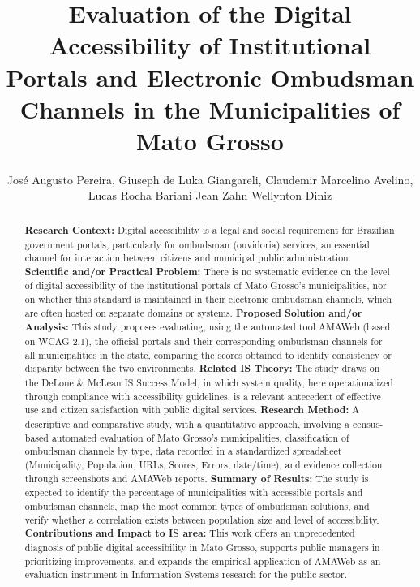 \documentclass[12pt]{article}
\title{Evaluation of the Digital Accessibility of Institutional Portals and Electronic Ombudsman Channels in the Municipalities of Mato Grosso}
\author{José Augusto Pereira\inst{1}, Giuseph de Luka Giangareli\inst{1}, Claudemir Marcelino Avelino\inst{1}, \\ Lucas Rocha Bariani\inst{1} Jean Zahn\inst{1} Wellynton Diniz \inst{1}}
\begin{document}
 

\maketitle

\begin{abstract}
\textbf{Research Context:} Digital accessibility is a legal and social requirement for Brazilian government portals, particularly for ombudsman (ouvidoria) services, an essential channel for interaction between citizens and municipal public administration.
\textbf{Scientific and/or Practical Problem:} There is no systematic evidence on the level of digital accessibility of the institutional portals of Mato Grosso's municipalities, nor on whether this standard is maintained in their electronic ombudsman channels, which are often hosted on separate domains or systems.
\textbf{Proposed Solution and/or Analysis:} This study proposes evaluating, using the automated tool AMAWeb (based on WCAG 2.1), the official portals and their corresponding ombudsman channels for all municipalities in the state, comparing the scores obtained to identify consistency or disparity between the two environments.
\textbf{Related IS Theory:} The study draws on the DeLone \& McLean IS Success Model, in which system quality, here operationalized through compliance with accessibility guidelines, is a relevant antecedent of effective use and citizen satisfaction with public digital services.
\textbf{Research Method:} A descriptive and comparative study, with a quantitative approach, involving a census-based automated evaluation of Mato Grosso's municipalities, classification of ombudsman channels by type, data recorded in a standardized spreadsheet (Municipality, Population, URLs, Scores, Errors, date/time), and evidence collection through screenshots and AMAWeb reports.
\textbf{Summary of Results:} The study is expected to identify the percentage of municipalities with accessible portals and ombudsman channels, map the most common types of ombudsman solutions, and verify whether a correlation exists between population size and level of accessibility.
\textbf{Contributions and Impact to IS area:} This work offers an unprecedented diagnosis of public digital accessibility in Mato Grosso, supports public managers in prioritizing improvements, and expands the empirical application of AMAWeb as an evaluation instrument in Information Systems research for the public sector.
\end{abstract}
     
\end{document}
